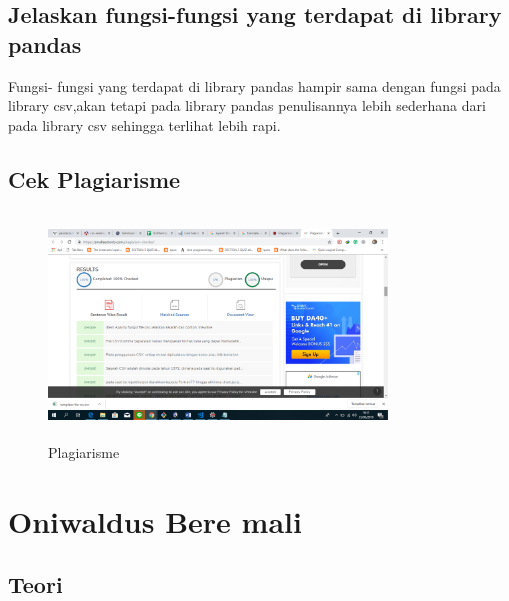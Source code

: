 \subsection{Jelaskan fungsi-fungsi yang terdapat di library pandas}
Fungsi- fungsi yang terdapat di library pandas hampir sama dengan fungsi pada library csv,akan tetapi pada library pandas penulisannya lebih sederhana dari pada library csv sehingga terlihat lebih rapi.
		
\subsection{Cek Plagiarisme}
	\begin{figure}[!htbp]
	\centering
	\includegraphics[width=9cm,height=6cm]{figures/4/1174096/teori/plagiarisme.png}
	\caption{Plagiarisme}
	\label{plagiarisme}
	\end{figure}

\section{Oniwaldus Bere mali}
\subsection{Teori}
